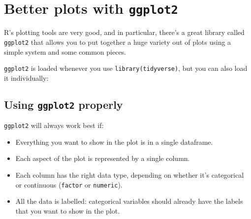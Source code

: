 \documentclass[
]{book}
\newenvironment{Shaded}{\begin{snugshade}}{\end{snugshade}}
\newcommand{\AttributeTok}[1]{\textcolor[rgb]{0.77,0.63,0.00}{#1}}
\newcommand{\CommentTok}[1]{\textcolor[rgb]{0.56,0.35,0.01}{\textit{#1}}}
\newcommand{\DecValTok}[1]{\textcolor[rgb]{0.00,0.00,0.81}{#1}}
\newcommand{\FloatTok}[1]{\textcolor[rgb]{0.00,0.00,0.81}{#1}}
\newcommand{\FunctionTok}[1]{\textcolor[rgb]{0.00,0.00,0.00}{#1}}
\newcommand{\NormalTok}[1]{#1}
\newcommand{\OtherTok}[1]{\textcolor[rgb]{0.56,0.35,0.01}{#1}}
\newcommand{\SpecialCharTok}[1]{\textcolor[rgb]{0.00,0.00,0.00}{#1}}
\newcommand{\StringTok}[1]{\textcolor[rgb]{0.31,0.60,0.02}{#1}}
\providecommand{\tightlist}{%
  \setlength{\itemsep}{0pt}\setlength{\parskip}{0pt}}
\begin{document}
\hypertarget{better-plots-with-ggplot2}{%
\chapter{\texorpdfstring{Better plots with \texttt{ggplot2}}{Better plots with ggplot2}}\label{better-plots-with-ggplot2}}

R's plotting tools are very good, and in particular, there's
a great library called \texttt{ggplot2} that allows you to put together
a huge variety out of plots using a simple system and some
common pieces.

\texttt{ggplot2} is loaded whenever you use \texttt{library(tidyverse)},
but you can also load it individually:

\begin{Shaded}
\end{Shaded}

\hypertarget{using-ggplot2-properly}{%
\section{\texorpdfstring{Using \texttt{ggplot2} properly}{Using ggplot2 properly}}\label{using-ggplot2-properly}}

\texttt{ggplot2} will always work best if:

\begin{itemize}
\tightlist
\item
  Everything you want to show in the plot is
  in a single dataframe.
\item
  Each aspect of the plot is represented by a single
  column.
\item
  Each column has the right data type, depending
  on whether it's categorical or continuous
  (\texttt{factor} or \texttt{numeric}).
\item
  All the data is labelled: categorical variables
  should already have the labels that you want to show in the plot.
\end{itemize}
\end{document}
